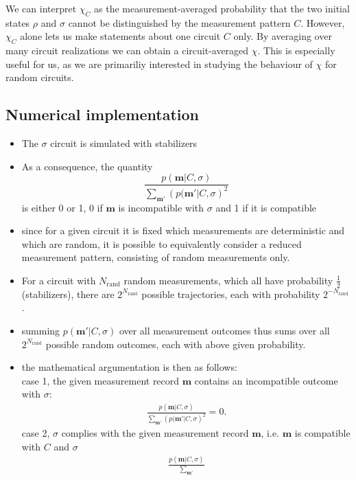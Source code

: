 We can interpret $\chi_C$ as the measurement-averaged probability that the two
initial states $\rho$ and $\sigma$ cannot be distinguished by the measurement
pattern $C$. However, $\chi_C$ alone lets us make statements about one circuit
$C$ only.  By averaging over many circuit realizations we can obtain a
circuit-averaged $\chi$. This is especially useful for us, as we are primariliy
interested in studying the behaviour of $\chi$ for random circuits.


\subsection{Numerical implementation}
\label{sec:lxe-numeric}
\begin{itemize} 
  \item The $\sigma$ circuit is simulated with stabilizers
  \item As a consequence, the quantity \[ \frac{p(\mathbf{m} | C,
    \sigma)}{\sum_{\mathbf{m}'} \left(p(\mathbf{m}' | C, \sigma \right)^2} \] is
    either 0 or 1, 0 if $\mathbf{m}$ is incompatible with $\sigma$ and 1 if it
    is compatible \item since for a given circuit it is fixed which
    measurements are deterministic and which are random, it is possible to
    equivalently consider a reduced measurement pattern, consisting of random
    measurements only.
  \item For a circuit with $N_\mathrm{rand}$ random measurements, which all
    have probability $\frac{1}{2}$ (stabilizers), there are
    $2^{N_\mathrm{rand}}$ possible trajectories, each with probability
    $2^{-N_\mathrm{rand}}$.  \item summing $p(\mathbf{m}' | C, \sigma)$ over all
    measurement outcomes thus sums over all $2^{N_\mathrm{rand}}$ possible
    random outcomes, each with above given probability.  \item the mathematical
    argumentation is then as follows:\\
    case 1, the given measurement record $\mathbf{m}$ contains an
    incompatible outcome with $\sigma$:
    \begin{align} \frac{p(\mathbf{m} | C,
        \sigma)}{\sum_{\mathbf{m}'} \left(p(\mathbf{m}' | C, \sigma \right)^2} = 0
    .\end{align} 
    case 2, $\sigma$ complies with the given measurement record $\mathbf{m}$, i.e.
    $\mathbf{m}$ is compatible with $C$ and $\sigma$
      \begin{align} \frac{p(\mathbf{m} | C, \sigma)}{\sum_{\mathbf{m}'}
}
\end{align}
\end{itemize}
